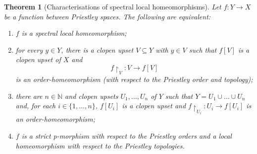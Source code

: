 \documentclass[12pt]{amsart}
\theoremstyle{plain}
\newtheorem{theorem}{Theorem}[section]
\theoremstyle{definition}
\newcommand{\N}{\mathbb{N}}
\begin{document}
\begin{theorem}[Characterisations of spectral local homeomorphisms] \label{thm.priest.loc}
    Let $f \colon Y \to X$ be a function between Priestley spaces. The following are equivalent:
    \begin{enumerate}
    
        \item \label{i:spectral-local}
        $f$ is a spectral local homeomorphism; 
    
        \item \label{i:in-terms-of-Priestley}
        for every $y\in Y$, there is a clopen upset $V\subseteq Y$ with $y\in V$ such that $f[V]$ is a clopen upset of $X$ and 
        \[
        f{\restriction}_V \colon V \longrightarrow f[V]
        \]
        is an order-homeomorphism (with respect to the Priestley order and topology);
        
        \item \label{i: Local homeomorphism decomposition} there are $n \in \N$ and clopen upsets $U_{1},\dots,U_{n}$ of $Y$ such that $Y=U_{1}\cup\dots\cup U_{n}$ and, for each $i \in \{1, \dots, n\}$, $f[U_i]$ is a clopen upset and $f {\restriction}_{U_i} \colon U_i \to f[U_i]$ is an order-homeomorphism;
        
        \item \label{i:nhb-spectral-lh-versus-strict-pm2} 
        $f$ is a strict p-morphism with respect to the Priestley orders and a local homeomorphism with respect to the Priestley topologies.
    \end{enumerate}
\end{theorem}
\end{document}
